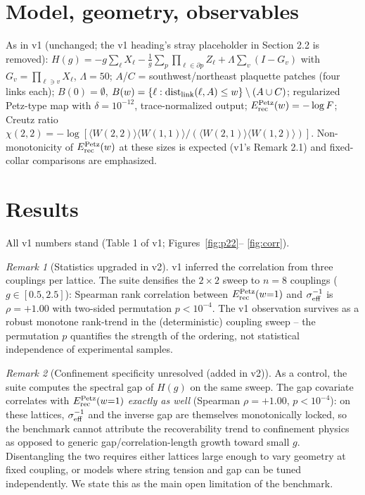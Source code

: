 \documentclass[11pt]{article}
\theoremstyle{remark}
\newtheorem{remark}{Remark}[section]
\newcommand{\Erec}{E^{\rm Petz}_{\rm rec}}
\begin{document}
\section{Model, geometry, observables}
As in v1 (unchanged; the v1 heading's stray placeholder in Section 2.2 is
removed): $H(g) = -g\sum_\ell X_\ell - \tfrac1g \sum_p \prod_{\ell\in
\partial p} Z_\ell + \Lambda\sum_v (I - G_v)$ with $G_v = \prod_{\ell\ni
v} X_\ell$, $\Lambda = 50$; $A$/$C$ = southwest/northeast plaquette
patches (four links each); $B(0) = \emptyset$, $B(w) = \{\ell :
{\rm dist}_{\rm link}(\ell, A) \le w\} \setminus (A \cup C)$;
regularized Petz-type map with $\delta = 10^{-12}$, trace-normalized
output; $\Erec(w) = -\log F$; Creutz ratio $\chi(2,2) = -\log
[\langle W(2,2)\rangle\langle W(1,1)\rangle / (\langle W(2,1)\rangle
\langle W(1,2)\rangle)]$. Non-monotonicity of $\Erec(w)$ at these sizes
is expected (v1's Remark 2.1) and fixed-collar comparisons are
emphasized.

\section{Results}
All v1 numbers stand (Table 1 of v1; Figures~\ref{fig:p22}--%
\ref{fig:corr}).

\begin{remark}[Statistics upgraded in v2]
\label{rem:stats}
v1 inferred the correlation from three couplings per lattice. The suite
densifies the $2\times2$ sweep to $n = 8$ couplings ($g \in [0.5, 2.5]$):
Spearman rank correlation between $\Erec(w{=}1)$ and $\sigma_{\rm
eff}^{-1}$ is $\rho = +1.00$ with two-sided permutation $p < 10^{-4}$.
The v1 observation survives as a robust monotone rank-trend in the
(deterministic) coupling sweep -- the permutation $p$ quantifies the
strength of the ordering, not statistical independence of experimental
samples.
\end{remark}

\begin{remark}[Confinement specificity unresolved (added in v2)]
\label{rem:gap}
As a control, the suite computes the spectral gap of $H(g)$ on the same
sweep. The gap covariate correlates with $\Erec(w{=}1)$ \emph{exactly as
well} (Spearman $\rho = +1.00$, $p < 10^{-4}$): on these lattices,
$\sigma_{\rm eff}^{-1}$ and the inverse gap are themselves monotonically
locked, so the benchmark cannot attribute the recoverability trend to
confinement physics as opposed to generic gap/correlation-length growth
toward small $g$. Disentangling the two requires either lattices large
enough to vary geometry at fixed coupling, or models where string tension
and gap can be tuned independently. We state this as the main open
limitation of the benchmark.
\end{remark}
\end{document}

